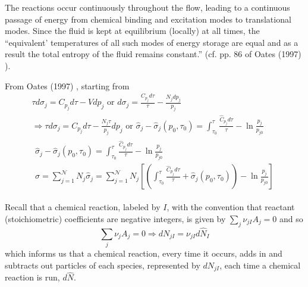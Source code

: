 \documentclass[10pt]{amsart}
\begin{document}
\begin{multicols*}{2}
The reactions occur continuously throughout the flow, leading to a continuous passage of energy from chemical binding and excitation modes to translational modes.  Since the fluid is kept at equilibrium (locally) at all times, the ``equivalent' temperatures of all such modes of energy storage are equal and as a result the total entropy of the fluid remains constant.'' (cf. pp. 86 of Oates (1997) \cite{GOates1997}).  

From Oates (1997) \cite{GOates1997}, starting from 
\[
\begin{gathered}
\tau d\sigma_j = C_{p_j} d\tau - Vdp_j \text{ or }   d\sigma_j = \frac{C_{p_j} d\tau }{ \tau } - \frac{N_j dp_j}{p_j} \\
  \Longrightarrow \tau d\sigma_j = C_{p_j} d\tau - \frac{N_j\tau}{p_j} dp_j \text{ or } \widehat{\sigma}_j - \widehat{\sigma}_j(p_0,\tau_0) = \int_{\tau_0}^{\tau} \frac{ \widehat{C}_{p_j} d\tau }{\tau } - \ln{ \frac{p_j}{p_{j0} } }  \\
\begin{gathered}
  \widehat{\sigma}_j - \widehat{\sigma}_j(p_0,\tau_0) = \int_{\tau_0}^{\tau} \frac{ \widehat{C}_{p_j} d\tau }{ \tau } - \ln{ \frac{p_j}{p_{j0}} } \\ 
  \sigma = \sum_{j=1}^{\mathcal{N}} N_j \widehat{\sigma}_j = \sum_{j=1}^{\mathcal{N}} N_j \left[ \left( \int_{\tau_0}^{\tau} \frac{\widehat{C}_{p_j} d\tau }{ \tau} + \widehat{\sigma}_j(p_0,\tau_0) \right) - \ln{ \frac{p_j}{p_{j0}} } \right]
\end{gathered}
\end{gathered}
\]

Recall that a chemical reaction, labeled by $I$,  with the convention that reactant (stoichiometric) coefficients are negative integers, is given by $\sum_j \nu_{jI} A_j =0$ and so 
\[
\sum_j \nu_j A_j = 0 \Longrightarrow dN_{jI} = \nu_{jI} d\widehat{N}_I
\]
which informs us that a chemical reaction, every time it occurs, adds in and subtracts out particles of each species, represented by $dN_{jI}$, each time a chemical reaction is run, $d\widehat{N}$.  


\end{multicols*}
\end{document}
